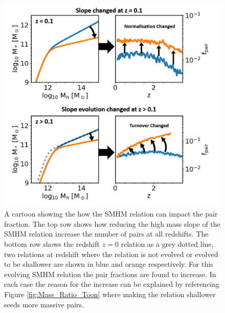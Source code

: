 \begin{figure}[h]
	\centering
	\includegraphics[width = \linewidth]{Figures/Chapter5/SMHM_PF_Cartoon.png}
	\caption{A cartoon showing the how the SMHM relation can impact the pair fraction. The top row shows how reducing the high mass slope of the SMHM relation increase the number of pairs at all redshifts. The bottom row shows the redshift $z=0$ relation as a grey dotted line, two relations at redshift where the relation is not evolved or evolved to be shallower are shown in blue and orange respectively. For this evolving SMHM relation the pair fractions are found to increase. In each case the reason for the increase can be explained by referencing Figure \ref{fig:Mass_Ratio_Toon} where making the relation shallower seeds more massive pairs.}
	\label{fig:Pair_Fraction_Toon}
\end{figure}

